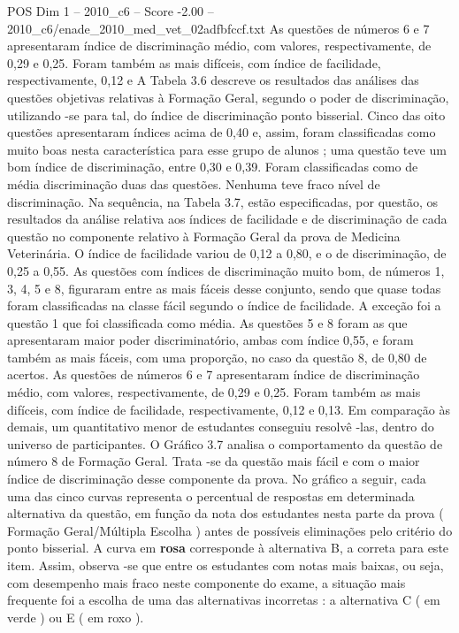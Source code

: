 \begin{textsample}{POS Dim 1 – 2010\_c6 – Score -2.00 – 2010\_c6/enade\_2010\_med\_vet\_02adfbfccf.txt}
As questões de números 6 e 7 apresentaram índice de discriminação médio, com valores, respectivamente, de 0,29 e 0,25.
Foram também as mais difíceis, com índice de facilidade, respectivamente, 0,12 e A Tabela 3.6 descreve os resultados das análises das questões objetivas relativas à Formação Geral, segundo o poder de discriminação, utilizando -se para tal, do índice de discriminação ponto bisserial.
Cinco das oito questões apresentaram índices acima de 0,40 e, assim, foram classificadas como muito boas nesta característica para esse grupo de alunos ; uma questão teve um bom índice de discriminação, entre 0,30 e 0,39.
Foram classificadas como de média discriminação duas das questões.
Nenhuma teve fraco nível de discriminação.
Na sequência, na Tabela 3.7, estão especificadas, por questão, os resultados da análise relativa aos índices de facilidade e de discriminação de cada questão no componente relativo à Formação Geral da prova de Medicina Veterinária.
O índice de facilidade variou de 0,12 a 0,80, e o de discriminação, de 0,25 a 0,55.
As questões com índices de discriminação muito bom, de números 1, 3, 4, 5 e 8, figuraram entre as mais fáceis desse conjunto, sendo que quase todas foram classificadas na classe fácil segundo o índice de facilidade.
A exceção foi a questão 1 que foi classificada como média.
As questões 5 e 8 foram as que apresentaram maior poder discriminatório, ambas com índice 0,55, e foram também as mais fáceis, com uma proporção, no caso da questão 8, de 0,80 de acertos.
As questões de números 6 e 7 apresentaram índice de discriminação médio, com valores, respectivamente, de 0,29 e 0,25.
Foram também as mais difíceis, com índice de facilidade, respectivamente, 0,12 e 0,13.
Em comparação às demais, um quantitativo menor de estudantes conseguiu resolvê -las, dentro do universo de participantes.
O Gráfico 3.7 analisa o comportamento da questão de número 8 de Formação Geral.
Trata -se da questão mais fácil e com o maior índice de discriminação desse componente da prova.
No gráfico a seguir, cada uma das cinco curvas representa o percentual de respostas em determinada alternativa da questão, em função da nota dos estudantes nesta parte da prova ( Formação Geral/Múltipla Escolha ) antes de possíveis eliminações pelo critério do ponto bisserial.
A curva em \textbf{rosa} corresponde à alternativa B, a correta para este item.
Assim, observa -se que entre os estudantes com notas mais baixas, ou seja, com desempenho mais fraco neste componente do exame, a situação mais frequente foi a escolha de uma das alternativas incorretas : a alternativa C ( em verde ) ou E ( em roxo ).

\end{textsample}
